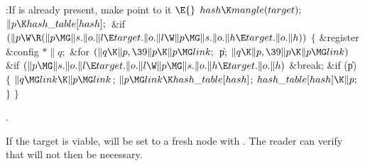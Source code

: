 \Y\B\4:If  is already present, make  point to it%
\X${}\E{}$\6
$\\{hash}\K\\{mangle}(\\{target});{}$\6
${}\|p\K\\{hash\_table}[\\{hash}];{}$\6
\&{if} ${}(\|p\W\R(\|p\MG\|s.\|o.\|l\E\\{target}.\|o.\|l\W\|p\MG\|s.\|o.\|h\E%
\\{target}.\|o.\|h)){}$\5
${}\{{}$\1\6
\&{register} \&{config} ${}{*}\|q;{}$\7
\&{for} ${}(\|q\K\|p,\39\|p\K\|p\MG\\{link};{}$ \|p; ${}\|q\K\|p,\39\|p\K\|p\MG%
\\{link}){}$\1\6
\&{if} ${}(\|p\MG\|s.\|o.\|l\E\\{target}.\|o.\|l\W\|p\MG\|s.\|o.\|h\E%
\\{target}.\|o.\|h){}$\1\5
\&{break};\2\2\6
\&{if} (\|p)\5
${}\{{}$\1\6
${}\|q\MG\\{link}\K\|p\MG\\{link}{}$;\6
${}\|p\MG\\{link}\K\\{hash\_table}[\\{hash}]{}$;\6
${}\\{hash\_table}[\\{hash}]\K\|p;{}$\6
\4${}\}{}$\2\6
\4${}\}{}$\2\par
{}.\fi

If the target is viable,  will be set to a fresh
node with
. The reader can verify that 
will not
then be necessary.

